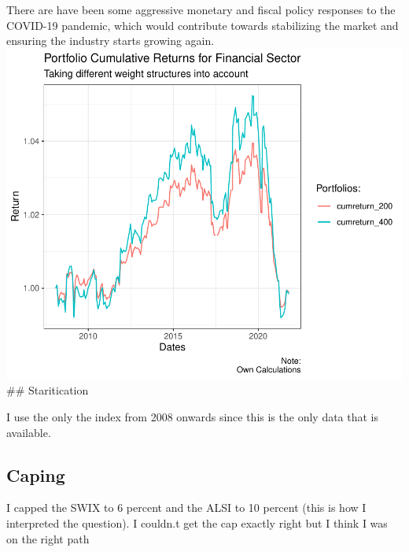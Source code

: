 \documentclass[11pt,preprint, authoryear]{elsarticle}
\numberwithin{equation}{section}
\numberwithin{figure}{section}
\numberwithin{table}{section}
\begin{document}
There are have been some aggressive monetary and fiscal policy responses
to the COVID-19 pandemic, which would contribute towards stabilizing the
market and ensuring the industry starts growing again.
\includegraphics{Question2_files/figure-latex/unnamed-chunk-4-1.pdf}
\#\# Staritication

I use the only the index from 2008 onwards since this is the only data
that is available.

\hypertarget{caping}{%
\subsection{Caping}\label{caping}}

I capped the SWIX to 6 percent and the ALSI to 10 percent (this is how I
interpreted the question). I couldn.t get the cap exactly right but I
think I was on the right path


\end{document}
